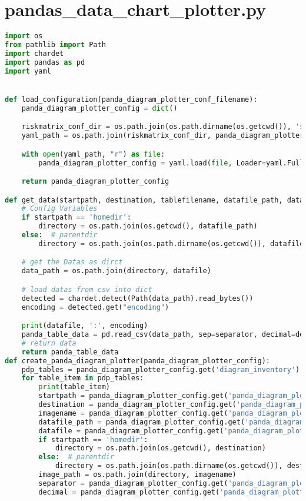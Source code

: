 
\section{pandas\_data\_chart\_plotter.py}
\lstset{style=gra_codestyle}
\begin{lstlisting}[language=python, caption=Python LaTex - pandas\_data\_chart\_plotter.py CSV - Diagramm,captionpos=b,label={lst:pandas_data_chart_plotter},breaklines=true]
import os
from pathlib import Path
import chardet
import pandas as pd
import yaml


def load_configuration(panda_diagram_plotter_conf_filename):
    panda_diagram_plotter_config = dict()

    riskmatrix_conf_dir = os.path.join(os.path.dirname(os.getcwd()), 'source', 'configuration')
    yaml_path = os.path.join(riskmatrix_conf_dir, panda_diagram_plotter_conf_filename)

    with open(yaml_path, "r") as file:
        panda_diagram_plotter_config = yaml.load(file, Loader=yaml.FullLoader)

    return panda_diagram_plotter_config

def get_data(startpath, destination, tablefilename, datafile_path, datafile, separator, decimal):
    # Config Variables
    if startpath == 'homedir':
        directory = os.path.join(os.getcwd(), datafile_path)
    else:  # parentdir
        directory = os.path.join(os.path.dirname(os.getcwd()), datafile_path)

    # get the Datas as dirct
    data_path = os.path.join(directory, datafile)

    # load datas from csv into dict
    detected = chardet.detect(Path(data_path).read_bytes())
    encoding = detected.get("encoding")

    print(datafile, ':', encoding)
    panda_table_data = pd.read_csv(data_path, sep=separator, decimal=decimal, encoding=encoding)
    # return data
    return panda_table_data
def create_panda_diagram_plotter(panda_diagram_plotter_config):
    pdp_tables = panda_diagram_plotter_config.get('diagram_inventory')
    for table_item in pdp_tables:
        print(table_item)
        startpath = panda_diagram_plotter_config.get('panda_diagram_plotter').get(table_item).get('startpath')
        destination = panda_diagram_plotter_config.get('panda_diagram_plotter').get(table_item).get('destination_path')
        imagename = panda_diagram_plotter_config.get('panda_diagram_plotter').get(table_item).get('imagename')
        datafile_path = panda_diagram_plotter_config.get('panda_diagram_plotter').get(table_item).get('datafile_path')
        datafile = panda_diagram_plotter_config.get('panda_diagram_plotter').get(table_item).get('datafile')
        if startpath == 'homedir':
            directory = os.path.join(os.getcwd(), destination)
        else:  # parentdir
            directory = os.path.join(os.path.dirname(os.getcwd()), destination)
        image_path = os.path.join(directory, imagename)
        separator = panda_diagram_plotter_config.get('panda_diagram_plotter').get(table_item).get('separator')
        decimal = panda_diagram_plotter_config.get('panda_diagram_plotter').get(table_item).get('decimal')


\end{lstlisting}
